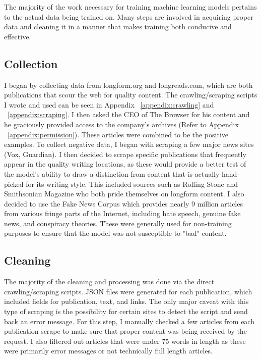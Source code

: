 The majority of the work necessary for training machine learning models pertains to the actual data being trained on. Many steps are involved in acquiring proper data and cleaning it in a manner that makes training both conducive and effective.

\subsection{Collection}
I began by collecting data from longform.org and longreads.com, which are both publications that scour the web for quality content. The crawling/scraping scripts I wrote and used can be seen in Appendix ~\ref{appendix:crawling} and ~\ref{appendix:scraping}. I then asked the CEO of The Browser for his content and he graciously provided access to the company’s archives (Refer to Appendix ~\ref{appendix:permission}). These articles were combined to be the positive examples. To collect negative data, I began with scraping a few major news sites (Vox, Guardian). I then decided to scrape specific publications that frequently appear in the quality writing locations, as these would provide a better test of the model’s ability to draw a distinction from content that is actually hand-picked for its writing style. This included sources such as Rolling Stone and Smithsonian Magazine who both pride themselves on longform content. I also decided to use the Fake News Corpus which provides nearly 9 million articles from various fringe parts of the Internet, including hate speech, genuine fake news, and conspiracy theories. These were generally used for non-training purposes to ensure that the model was not susceptible to "bad" content.

\subsection{Cleaning}
The majority of the cleaning and processing was done via the direct crawling/scraping scripts. JSON files were generated for each publication, which included fields for publication, text, and links. The only major caveat with this type of scraping is the possibility for certain sites to detect the script and send back an error message. For this step, I manually checked a few articles from each publication scrape to make sure that proper content was being received by the request. I also filtered out articles that were under 75 words in length as these were primarily error messages or not technically full length articles.

